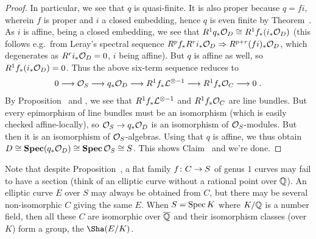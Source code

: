 \documentclass[a4paper,parskip=half,numbers=enddot, DIV=12]{scrreprt}
\begin{document}
\begin{proof}
	In particular, we see that $q$ is quasi-finite. It is also proper because $q=fi$, wherein $f$ is proper and $i$ a closed embedding, hence $q$ is even finite by Theorem~. As $i$ is affine, being a closed embedding, we see that $R^1q_*\mathcal{O}_D\cong R^1f_*(i_*\mathcal{O}_D)$ (this follows e.g.\ from Leray's spectral sequence $R^pf_*R^ri_*\Oo_D\converge R^{p+r}(fi)_*\Oo_D$, which degenerates as $R^ri_*\mathcal{O}_D=0$, $i$ being affine). But $q$ is affine as well, so $R^1f_*(i_*\mathcal{O}_D)=0$. Thus the above six-term sequence reduces to 
	\begin{align}
		0\morphism \Oo_S\morphism q_*\Oo_D\morphism R^1f_*\Ll^{\otimes -1}\morphism R^1f_*\Oo_C\morphism 0\;.
	\end{align}
	By Proposition~ and , we see that $R^1f_*\mathcal{L}^{\otimes -1}$ and $R^1f_*\mathcal{O}_C$ are line bundles. But every epimorphism of line bundles must be an isomorphism (which is easily checked affine-locally), so $\Oo_S\morphism q_*\Oo_D$ is an isomorphism of $\mathcal{O}_S$-modules. But then it is an isomorphism of $\mathcal{O}_S$-algebras. Using that $q$ is affine, we thus obtain $D\cong \operatorname{\mathbf{Spec}} (q_*\mathcal{O}_D)\cong \operatorname{\mathbf{Spec}}\mathcal{O}_S\cong S$. This shows Claim~ and we're done.
\end{proof}
\begin{rem}
	Note that despite Proposition~, a flat family $f\colon C\morphism S$ of genus $1$ curves may fail to have a section (think of an elliptic curve without a rational point over $\mathbb{Q}$). An elliptic curve $E$ over $S$ may always be obtained from $C$, but there may be several non-isomorphic $C$ giving the same $E$. When $S=\operatorname{Spec} K$ where $K/\mathbb{Q}$ is a number field, then all these $C$ are isomorphic over $\overline{\mathbb{Q}}$ and their isomorphism classes (over $K$) form a group, the  $\Sha(E/K)$.
\end{rem}
\end{document}
